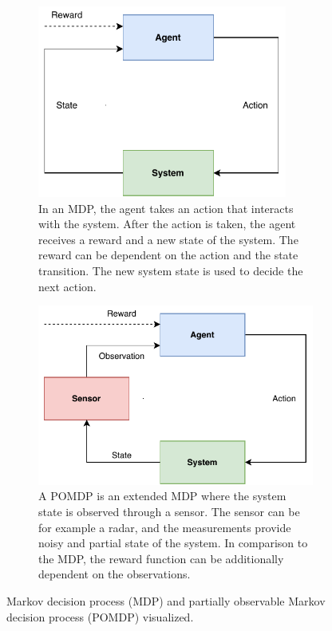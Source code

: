 \documentclass[english, 12pt, a4paper, elec, utf8, a-1b, online]{aaltothesis}
\begin{document}
\begin{figure}
    \centering
    \begin{subfigure}[b]{0.45\textwidth}
        \centering
        \includegraphics[width=0.9\textwidth]{figures/MDP.pdf}
        \caption{
        In an MDP, the agent takes an action that interacts with the system.
        After the action is taken, the agent receives a reward and a new state of the system.
        The reward can be dependent on the action and the state transition.
        The new system state is used to decide the next action.}
        \label{fig:mdp}
    \end{subfigure}
    \hfill
    \begin{subfigure}[b]{0.45\textwidth}
        \centering
        \includegraphics[width=\textwidth]{figures/POMDP.pdf}
        \caption{
        A POMDP is an extended MDP where the system state is observed through a sensor.
        The sensor can be for example a radar, and the measurements provide noisy and partial state of the system. 
        In comparison to the MDP, the reward function can be additionally dependent on the observations.
        }
        \label{fig:pomdp}
    \end{subfigure}
    \caption{Markov decision process (MDP) and partially observable Markov decision process (POMDP) visualized. }
    \label{fig:MDP_and_POMDP}
\end{figure}
\end{document}
